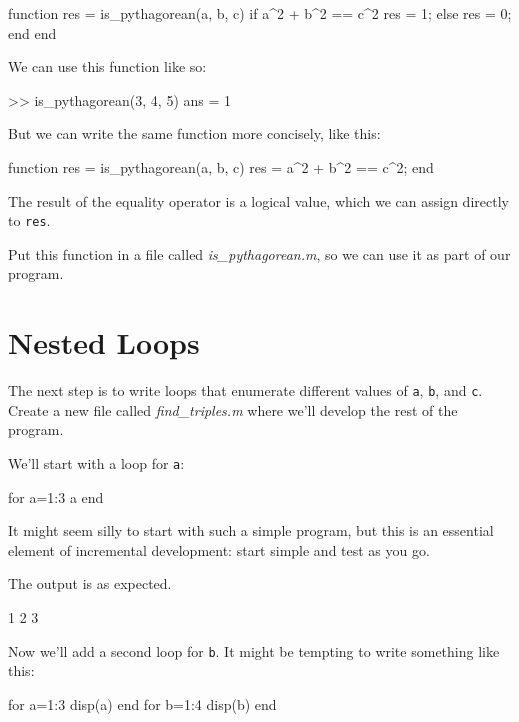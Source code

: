 \begin{code}
function res = is_pythagorean(a, b, c)
    if a^2 + b^2 == c^2
        res = 1;
    else
        res = 0;
    end
end
\end{code}

We can use this function like so:


\begin{code}
>> is_pythagorean(3, 4, 5)
ans = 1
\end{code}

But we can write the same function more concisely, like this:

\begin{code}
function res = is_pythagorean(a, b, c)
    res = a^2 + b^2 == c^2;
end
\end{code}

The result of the equality operator is a logical value, which we can assign directly 
to \lstinline{res}.

Put this function in a file called \emph{is\_pythagorean.m}, so we can use it as part of our program.


\section{Nested Loops}

The next step is to write loops that enumerate different values of \lstinline{a}, \lstinline{b}, and 
\lstinline{c}.  Create a new file called \emph{find\_triples.m} where we'll develop the rest of the program.


We'll start with a loop for \lstinline{a}:

\begin{code}
for a=1:3
    a
end
\end{code}

It might seem silly to start with such a simple program, but this is an essential element of incremental development: start simple and test as you go.

The output is as expected.

\begin{code}
1
2
3
\end{code}

Now we'll add a second loop for \lstinline{b}.  It might be tempting to write something like this:

\begin{code}
for a=1:3
    disp(a)
end
for b=1:4
    disp(b)
end
\end{code}

